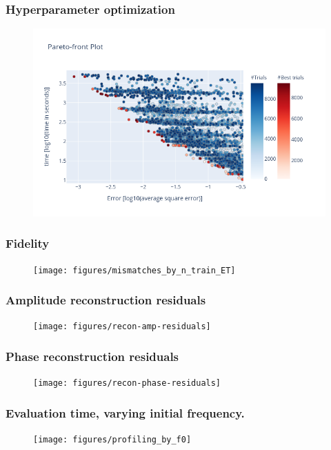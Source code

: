 \documentclass{beamer}
\begin{document}
\begin{frame}
    \frametitle{Hyperparameter optimization}
    \begin{figure}[ht]
    \centering
    \includegraphics[width=\textwidth]{figures/pareto-front}
    \label{fig:pareto-front-nonspinning}
    \end{figure}
\end{frame}

\begin{frame}
    \frametitle{Fidelity}
    \begin{figure}[ht]
    \centering
    \texttt{[image: figures/mismatches\_by\_n\_train\_ET]}
    \end{figure}
\end{frame}

\begin{frame}
    \frametitle{Amplitude reconstruction residuals}
    \begin{figure}[ht]
    \centering
    \texttt{[image: figures/recon-amp-residuals]}
    \label{fig:recon-amp-residuals}
    \end{figure}
\end{frame}

\begin{frame}
    \frametitle{Phase reconstruction residuals}
    \begin{figure}[ht]
    \centering
    \texttt{[image: figures/recon-phase-residuals]}
    \label{fig:recon-phase-residuals}
    \end{figure}
\end{frame}

\begin{frame}
    \frametitle{Evaluation time, varying initial frequency.}    
    \begin{figure}[ht]
    \centering
    \texttt{[image: figures/profiling\_by\_f0]}
    \label{fig:profiling_by_f0}
    \end{figure}
\end{frame}
\end{document}
